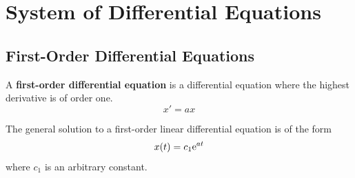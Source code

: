 \documentclass{article}
\begin{document}
\section{System of Differential Equations}
\subsection{First-Order Differential Equations}
\begin{definition}
    A \textbf{first-order differential equation} is a differential
    equation where the highest derivative is of order one.
    \begin{equation*}
        x' = a x
    \end{equation*}
\end{definition}
\begin{theorem}
    The general solution to a first-order linear differential equation
    is of the form
    \begin{equation*}
        x(t) = c_1 \mathrm{e}^{a t}
    \end{equation*}
    where \(c_1\) is an arbitrary constant.
\end{theorem}
\end{document}
